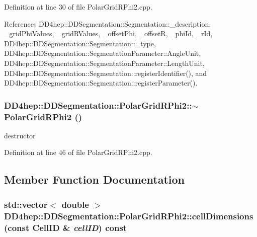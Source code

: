 Definition at line 30 of file PolarGridRPhi2.cpp.

References DD4hep::DDSegmentation::Segmentation::\_\-description, \_\-gridPhiValues, \_\-gridRValues, \_\-offsetPhi, \_\-offsetR, \_\-phiId, \_\-rId, DD4hep::DDSegmentation::Segmentation::\_\-type, DD4hep::DDSegmentation::SegmentationParameter::AngleUnit, DD4hep::DDSegmentation::SegmentationParameter::LengthUnit, DD4hep::DDSegmentation::Segmentation::registerIdentifier(), and DD4hep::DDSegmentation::Segmentation::registerParameter().\hypertarget{class_d_d4hep_1_1_d_d_segmentation_1_1_polar_grid_r_phi2_a63dc7071aea7a6fbcb5a01b35bdad59e}{
\subsubsection[{$\sim$PolarGridRPhi2}]{\setlength{\rightskip}{0pt plus 5cm}DD4hep::DDSegmentation::PolarGridRPhi2::$\sim$PolarGridRPhi2 ()}}
\label{class_d_d4hep_1_1_d_d_segmentation_1_1_polar_grid_r_phi2_a63dc7071aea7a6fbcb5a01b35bdad59e}


destructor 

Definition at line 46 of file PolarGridRPhi2.cpp.

\subsection{Member Function Documentation}
\hypertarget{class_d_d4hep_1_1_d_d_segmentation_1_1_polar_grid_r_phi2_a15d4dfe8784e9ec12a6d801231925b12}{
\subsubsection[{cellDimensions}]{\setlength{\rightskip}{0pt plus 5cm}std::vector$<$ double $>$ DD4hep::DDSegmentation::PolarGridRPhi2::cellDimensions (const {\bf CellID} \& {\em cellID}) const}}
\label{class_d_d4hep_1_1_d_d_segmentation_1_1_polar_grid_r_phi2_a15d4dfe8784e9ec12a6d801231925b12}


